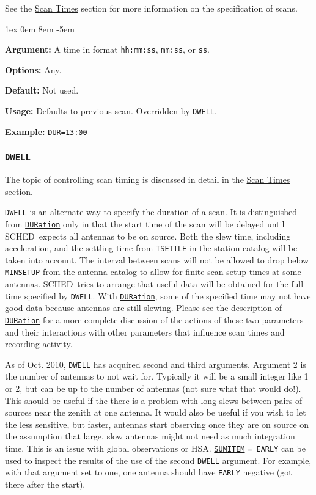\documentclass{report}
\newcommand{\schedb}{{\sc SCHED~}}
\newcommand{\rcwbox}[5]{
  \begin{list}{}{\parsep 1ex  \itemsep 0em
                 \leftmargin 8em  \itemindent -5em }
    \item {\bf Argument:} #1
    \item {\bf Options:}  #2
    \item {\bf Default:}  #3
    \item {\bf Usage:}    #4
    \item {\bf Example:}  #5
  \end{list}
}
\begin{document}
See the 
{\hyperref[SSEC:SCANTIMES]{Scan Times}} section for more
information on the specification of scans.

\rcwbox
{A time in format {\tt hh:mm:ss}, {\tt mm:ss}, or {\tt ss}.}
{Any.}
{Not used.}
{Defaults to previous scan. Overridden by {\tt DWELL}.}
{{\tt DUR=13:00}}


\subsubsection{\label{MP:DWELL}{\tt DWELL}}

The topic of controlling scan timing is discussed in detail in
the 
{\hyperref[SSEC:SCANTIMES]{Scan Times section}}.

{\tt DWELL} is an alternate way to specify the duration of a scan.  It
is distinguished from 
{\hyperref[MP:DUR]{{\tt DURation}}} only in that
the start time of the scan will be delayed until \schedb expects all
antennas to be on source.  Both the slew time, including acceleration,
and the settling time from {\tt TSETTLE} in the 
{\hyperref[SEC:STACAT]{station catalog}}
will be taken into account.  The interval between
scans will not be allowed to drop below {\tt MINSETUP} from the
antenna catalog to allow for finite scan setup times at some antennas.
\schedb tries to arrange that useful data will be obtained for the
full time specified by {\tt DWELL}.  With 
{\hyperref[MP:DUR]{{\tt DURation}}},
some of the specified time may not have good data
because antennas are still slewing.  Please see the description of
{\hyperref[MP:DUR]{{\tt DURation}}} for a more complete discussion of the
actions of these two parameters and their interactions with other
parameters that influence scan times and recording activity.

As of Oct. 2010, {\tt DWELL} has acquired second and third arguments.
Argument 2 is the number of antennas to not wait for.  Typically it
will be a small integer like 1 or 2, but can be up to the number of
antennas (not sure what that would do!).  This should be useful if the
there is a problem with long slews between pairs of sources near the
zenith at one antenna.  It would also be useful if you wish to let the
less sensitive, but faster, antennas start observing once they are on
source on the assumption that large, slow antennas might not need as
much integration time.  This is an issue with global observations or
HSA.  
{\hyperref[MP:SUMITEM]{{\tt SUMITEM}}} {\tt = EARLY} can be used
to inspect the results of the use of the second {\tt DWELL} argument.
For example, with that argument set to one, one antenna should have
{\tt EARLY} negative (got there after the start).
\end{document}
